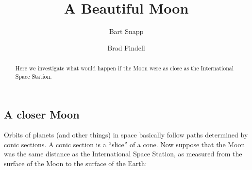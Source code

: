\documentclass{ximera}
\title[Epilogue:]{A Beautiful Moon}
\author{Bart Snapp \and Brad Findell}
\begin{document}
\begin{abstract}
Here we investigate what would happen if the Moon were as close as the
International Space Station.
\end{abstract}
\maketitle

\subsection{A closer Moon}

Orbits of planets (and other things) in space basically follow paths
determined by conic sections. A conic section is a ``slice'' of a
cone. Now suppose that the Moon was the same distance as the International
Space Station, as measured from the surface of the Moon to the surface
of the Earth: 
\end{document}
